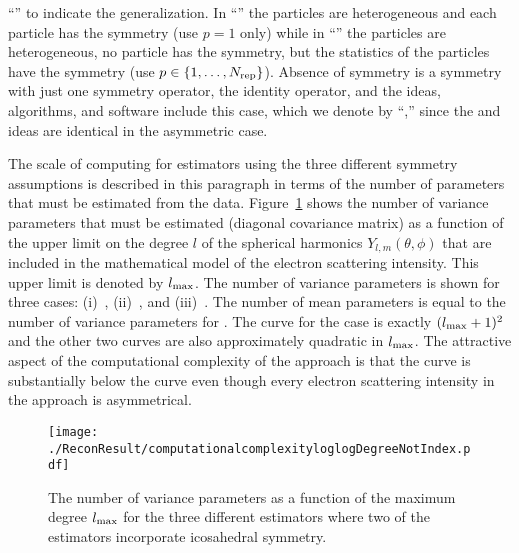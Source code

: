 ``{\heterosymstatistics}'' to indicate the generalization.
In ``{\heterosymparticles}'' the particles are heterogeneous and each
particle has the symmetry (use $p=1$ only)
while in ``{\heterosymstatistics}'' the particles
are heterogeneous, no particle has the symmetry, but the statistics of the
particles have the symmetry (use $p\in\{1,\dots,N_{\rm rep}\}$).
Absence of symmetry is a symmetry with just one symmetry operator, the
identity operator, and the ideas, algorithms, and software include this
case, which we denote by ``{\heteroasymmetry},'' since the {\heterosymparticles}
and {\heterosymstatistics} ideas are identical in the asymmetric case.
\par
The scale of computing for estimators using the three different symmetry
assumptions is described in this paragraph
in terms of the number of parameters that must be estimated from the data.
Figure~\ref{fig:computationalcomplexity} shows the number of variance
parameters that must be estimated (diagonal covariance matrix) as a
function of the upper limit on the degree $l$ of the spherical harmonics
$Y_{l,m}(\theta,\phi)$ that are included in the mathematical model of the
electron scattering intensity.
This upper limit is denoted by $l_{\rm max}$.
The number of variance parameters is shown for three cases:
(i)~{\heteroasymmetry}, %
(ii)~{\heterosymparticles}, %
and
(iii)~{\heterosymstatistics}. %
The number of mean parameters is equal to the number of variance parameters
for {\heterosymparticles}.
The curve for the {\heteroasymmetry} %
case is exactly $(l_{\rm max}+1)^2$ and the other two curves are also
approximately quadratic in $l_{\rm max}$.
The attractive aspect of the computational complexity of the
{\heterosymstatistics} approach is that the {\heterosymstatistics} curve is
substantially below the {\heteroasymmetry} %
curve even though every electron scattering intensity in the
{\heterosymstatistics} approach is asymmetrical.
\begin{figure}
\begin{center}
\texttt{[image: ./ReconResult/computationalcomplexityloglogDegreeNotIndex.pdf]}
\end{center}
\vspace*{-.2in}
\caption{
\label{fig:computationalcomplexity}
The number of variance parameters as a function of the maximum degree
$l_{\rm max}$ for the three different estimators where two of the
estimators incorporate icosahedral symmetry.
}
\end{figure}

